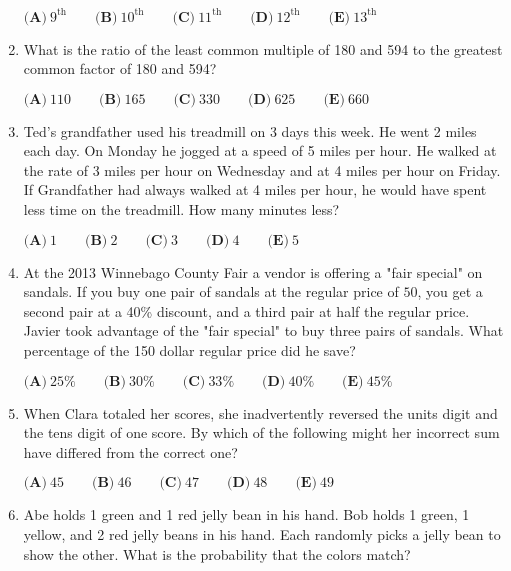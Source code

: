 \documentclass{article}
\begin{document}
\begin{enumerate}[label=\arabic*., itemsep=0.5em]
\(\textbf{(A)}\ 9^\text{th} \qquad \textbf{(B)}\ 10^\text{th} \qquad \textbf{(C)}\ 11^\text{th} \qquad \textbf{(D)}\ 12^\text{th} \qquad \textbf{(E)}\ 13^\text{th}\)\par \vspace{0.5em}\item What is the ratio of the least common multiple of 180 and 594 to the greatest common factor of 180 and 594?

\(\textbf{(A)}\ 110 \qquad \textbf{(B)}\ 165 \qquad \textbf{(C)}\ 330 \qquad \textbf{(D)}\ 625 \qquad \textbf{(E)}\ 660\)\par \vspace{0.5em}\item Ted's grandfather used his treadmill on 3 days this week. He went 2 miles each day. On Monday he jogged at a speed of 5 miles per hour. He walked at the rate of 3 miles per hour on Wednesday and at 4 miles per hour on Friday. If Grandfather had always walked at 4 miles per hour, he would have spent less time on the treadmill. How many minutes less?

\(\textbf{(A)}\ 1 \qquad \textbf{(B)}\ 2 \qquad \textbf{(C)}\ 3 \qquad \textbf{(D)}\ 4 \qquad \textbf{(E)}\ 5\)\par \vspace{0.5em}\item At the 2013 Winnebago County Fair a vendor is offering a "fair special" on sandals. If you buy one pair of sandals at the regular price of \(50\), you get a second pair at a 40\% discount, and a third pair at half the regular price. Javier took advantage of the "fair special" to buy three pairs of sandals. What percentage of the 150 dollar regular price did he save?

\(\textbf{(A)}\ 25\% \qquad \textbf{(B)}\ 30\% \qquad \textbf{(C)}\ 33\% \qquad \textbf{(D)}\ 40\% \qquad \textbf{(E)}\ 45\%\)\par \vspace{0.5em}\item When Clara totaled her scores, she inadvertently reversed the units digit and the tens digit of one score. By which of the following might her incorrect sum have differed from the correct one?

\(\textbf{(A)}\ 45 \qquad \textbf{(B)}\ 46 \qquad \textbf{(C)}\ 47 \qquad \textbf{(D)}\ 48 \qquad \textbf{(E)}\ 49\)\par \vspace{0.5em}\item Abe holds 1 green and 1 red jelly bean in his hand. Bob holds 1 green, 1 yellow, and 2 red jelly beans in his hand. Each randomly picks a jelly bean to show the other. What is the probability that the colors match?


\end{enumerate}
\end{document}
